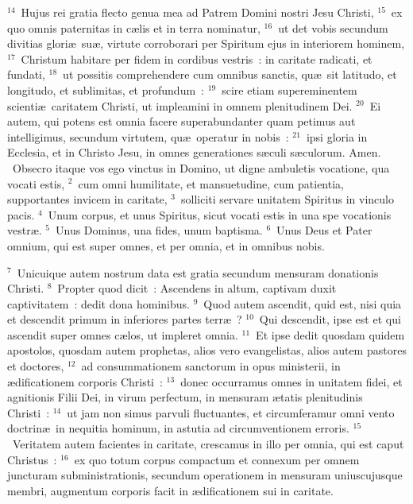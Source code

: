 ${}^{14}$~Hujus rei gratia flecto genua mea ad Patrem Domini nostri Jesu Christi,
${}^{15}$~ex quo omnis paternitas in c\ae lis et in terra nominatur,
${}^{16}$~ut det vobis secundum divitias glori\ae\ su\ae , virtute corroborari per Spiritum ejus in interiorem hominem,
${}^{17}$~Christum habitare per fidem in cordibus vestris~: in caritate radicati, et fundati,
${}^{18}$~ut possitis comprehendere cum omnibus sanctis, qu\ae\ sit latitudo, et longitudo, et sublimitas, et profundum~:
${}^{19}$~scire etiam supereminentem scienti\ae\ caritatem Christi, ut impleamini in omnem plenitudinem Dei.
${}^{20}$~Ei autem, qui potens est omnia facere superabundanter quam petimus aut intelligimus, secundum virtutem, qu\ae\ operatur in nobis~:
${}^{21}$~ipsi gloria in Ecclesia, et in Christo Jesu, in omnes generationes s\ae culi s\ae culorum. Amen.
~\lettrine[lines=10,image=true,loversize=0.05,lraise=-0.03]{O}{}bsecro itaque vos ego vinctus in Domino, ut digne ambuletis vocatione, qua vocati estis,
${}^{2}$~cum omni humilitate, et mansuetudine, cum patientia, supportantes invicem in caritate,
${}^{3}$~solliciti servare unitatem Spiritus in vinculo pacis.
${}^{4}$~Unum corpus, et unus Spiritus, sicut vocati estis in una spe vocationis vestr\ae .
${}^{5}$~Unus Dominus, una fides, unum baptisma.
${}^{6}$~Unus Deus et Pater omnium, qui est super omnes, et per omnia, et in omnibus nobis.


${}^{7}$~Unicuique autem nostrum data est gratia secundum mensuram donationis Christi.
${}^{8}$~Propter quod dicit~: Ascendens in altum, captivam duxit captivitatem~: dedit dona hominibus.
${}^{9}$~Quod autem ascendit, quid est, nisi quia et descendit primum in inferiores partes terr\ae~?
${}^{10}$~Qui descendit, ipse est et qui ascendit super omnes c\ae los, ut impleret omnia.
${}^{11}$~Et ipse dedit quosdam quidem apostolos, quosdam autem prophetas, alios vero evangelistas, alios autem pastores et doctores,
${}^{12}$~ad consummationem sanctorum in opus ministerii, in \ae dificationem corporis Christi~:
${}^{13}$~donec occurramus omnes in unitatem fidei, et agnitionis Filii Dei, in virum perfectum, in mensuram \ae tatis plenitudinis Christi~:
${}^{14}$~ut jam non simus parvuli fluctuantes, et circumferamur omni vento doctrin\ae\ in nequitia hominum, in astutia ad circumventionem erroris.
${}^{15}$~Veritatem autem facientes in caritate, crescamus in illo per omnia, qui est caput Christus~:
${}^{16}$~ex quo totum corpus compactum et connexum per omnem juncturam subministrationis, secundum operationem in mensuram uniuscujusque membri, augmentum corporis facit in \ae dificationem sui in caritate.


